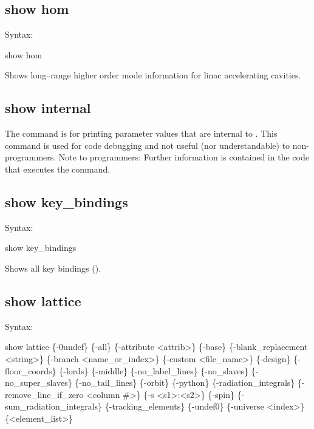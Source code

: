 {{{{{{{{\subsection{show hom}
\label{s:show.hom}

Syntax:
\begin{example}
  show hom
\end{example}

Shows long--range higher order mode information for linac accelerating
cavities.


\subsection{show internal}
\label{s:show.internal}

The  command is for printing parameter values that are internal to \tao. This
command is used for code debugging and not useful (nor understandable) to non-programmers. Note to
programmers: Further information is contained in the code that executes the 
command.


\subsection{show key_bindings}
\label{s:show.key}

Syntax:
\begin{example}
  show key_bindings
\end{example}

Shows all key bindings ().


\subsection{show lattice}
\label{s:show.lattice}

Syntax:
\begin{example}
  show lattice \{-0undef\} \{-all\} \{-attribute <attrib>\} \{-base\}
      \{-blank_replacement <string>\}  \{-branch <name_or_index>\}
      \{-custom <file_name>\} \{-design\} \{-floor_coords\} \{-lords\} \{-middle\}
      \{-no_label_lines\} \{-no_slaves\} \{-no_super_slaves\} \{-no_tail_lines\} \{-orbit\} 
      \{-python\} \{-radiation_integrals\} \{-remove_line_if_zero <column \#>\} 
      \{-s <s1>:<s2>\} \{-spin\} \{-sum_radiation_integrals\} \{-tracking_elements\} 
      \{-undef0\} \{-universe <index>\} \{<element_list>\} 
\end{example}

}}}}}}}}
